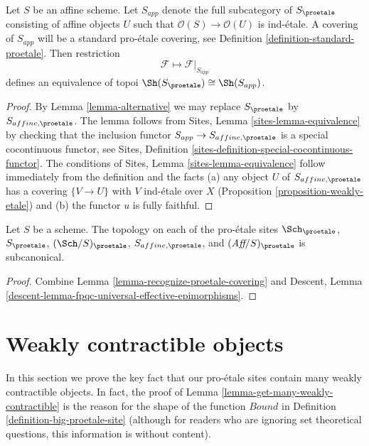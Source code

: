 \begin{lemma}
\label{lemma-affine-alternative}
Let $S$ be an affine scheme. Let $S_{app}$ denote the full subcategory
of $S_\proetale$ consisting of affine objects $U$ such that
$\mathcal{O}(S) \to \mathcal{O}(U)$ is ind-\'etale. A covering of
$S_{app}$ will be a standard pro-\'etale covering, see
Definition \ref{definition-standard-proetale}.
Then restriction
$$
\mathcal{F} \longmapsto \mathcal{F}|_{S_{app}}
$$
defines an equivalence of topoi $\Sh(S_\proetale) \cong \Sh(S_{app})$.
\end{lemma}

\begin{proof}
By Lemma \ref{lemma-alternative} we may replace $S_\proetale$ by
$S_{affine, \proetale}$.
The lemma follows from Sites, Lemma \ref{sites-lemma-equivalence}
by checking that the inclusion functor $S_{app} \to S_{affine, \proetale}$
is a special cocontinuous functor, see
Sites, Definition \ref{sites-definition-special-cocontinuous-functor}.
The conditions of Sites, Lemma \ref{sites-lemma-equivalence}
follow immediately from the definition and the facts
(a) any object $U$ of $S_{affine, \proetale}$ has a covering
$\{V \to U\}$ with $V$ ind-\'etale over $X$
(Proposition \ref{proposition-weakly-etale})
and (b) the functor $u$ is fully faithful.
\end{proof}

\begin{lemma}
\label{lemma-proetale-subcanonical}
Let $S$ be a scheme. The topology on each of the pro-\'etale sites
$\Sch_\proetale$, $S_\proetale$, $(\Sch/S)_\proetale$,
$S_{affine, \proetale}$, and $(\textit{Aff}/S)_\proetale$ is subcanonical.
\end{lemma}

\begin{proof}
Combine Lemma \ref{lemma-recognize-proetale-covering} and
Descent, Lemma \ref{descent-lemma-fpqc-universal-effective-epimorphisms}.
\end{proof}





\section{Weakly contractible objects}
\label{section-weakly-contractible}

\noindent
In this section we prove the key fact that our pro-\'etale sites
contain many weakly contractible objects. In fact, the proof of
Lemma \ref{lemma-get-many-weakly-contractible} is the reason for
the shape of the function $Bound$ in
Definition \ref{definition-big-proetale-site} (although
for readers who are ignoring set theoretical questions, this
information is without content).

